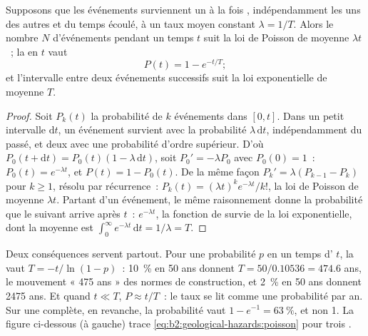 \begin{proposition}\label{prop:b2:geological-hazards:poisson}
Supposons que les événements surviennent un à la fois
, indépendamment les uns des autres et du temps écoulé, à un taux moyen
constant $\lambda = 1/T$. Alors le nombre $N$ d'événements pendant un temps $t$ suit
la loi de Poisson de moyenne $\lambda t$~; la  en $t$ vaut
\begin{equation}
P(t) = 1 - e^{-t/T};
\label{eq:b2:geological-hazards:poisson}
\end{equation}
et l'intervalle entre deux événements successifs suit la loi exponentielle de moyenne $T$.
\end{proposition}

\begin{proof}
Soit $P_k(t)$ la probabilité de $k$ événements dans $[0, t]$. Dans un petit intervalle
$\mathrm{d}t$, un événement survient avec la probabilité $\lambda\,\mathrm{d}t$,
indépendamment du passé, et deux avec une probabilité d'ordre supérieur. D'où
$P_0(t + \mathrm{d}t) = P_0(t)(1 - \lambda\,\mathrm{d}t)$, soit $P_0' = -\lambda P_0$ avec $P_0(0) = 1$~:
$P_0(t) = e^{-\lambda t}$, et $P(t) = 1 - P_0(t)$. De la même façon $P_k' = \lambda(P_{k-1} - P_k)$
pour $k \geq 1$, résolu par récurrence~: $P_k(t) = (\lambda t)^k e^{-\lambda t}/k!$, la loi
de Poisson de moyenne $\lambda t$. Partant d'un événement, le même raisonnement donne la
probabilité que le suivant arrive après $t$~: $e^{-\lambda t}$, la fonction de survie de la loi
exponentielle, dont la moyenne est $\int_0^\infty e^{-\lambda t}\,\mathrm{d}t = 1/\lambda = T$.
\end{proof}

Deux conséquences servent partout. Pour une probabilité $p$ en un temps d' $t$, la 
vaut $T = -t/\ln(1 - p)$~: \qty{10}{\percent} en 50 ans donnent $T = 50/0.10536 =
474.6$ ans, le mouvement « 475 ans » des normes de construction, et \qty{2}{\percent} en 50 ans
donnent 2475 ans. Et quand $t \ll T$, $P \approx t/T$~: le taux se lit comme une probabilité
par an. Sur une  complète, en revanche, la probabilité vaut $1 - e^{-1} =
\qty{63}{\percent}$, et non 1. La figure ci-dessous (à gauche) trace \eqref{eq:b2:geological-hazards:poisson}
pour trois .

